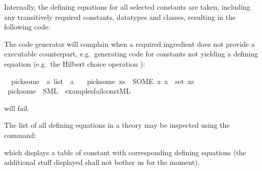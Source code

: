 \begin{isabellebody}
\begin{isamarkuptext}
  Internally, the defining equations for all selected
  constants are taken, including any transitively required
  constants, datatypes and classes, resulting in the following
  code:


  The code generator will complain when a required
  ingredient does not provide a executable counterpart,
  e.g.~generating code
  for constants not yielding
  a defining equation (e.g.~the Hilbert choice
  operation ):%
\end{isamarkuptext}%
\isamarkuptrue%
%
\isadelimML
%
\endisadelimML
%
\isatagML
%
\endisatagML
{\isafoldML}%
%
\isadelimML
%
\endisadelimML
{}\isamarkupfalse%
\isanewline
\ \ pick{\isacharunderscore}some\ {\isacharcolon}{\isacharcolon}\ {\isachardoublequoteopen}{\isacharprime}a\ list\ {\isasymRightarrow}\ {\isacharprime}a{\isachardoublequoteclose}\ \isanewline
\ \ {\isachardoublequoteopen}pick{\isacharunderscore}some\ xs\ {\isacharequal}\ {\isacharparenleft}SOME\ x{\isachardot}\ x\ {\isasymin}\ set\ xs{\isacharparenright}{\isachardoublequoteclose}%
\isadelimML
%
\endisadelimML
%
\isatagML
%
\endisatagML
{\isafoldML}%
%
\isadelimML
%
\endisadelimML
{}\isamarkupfalse%
\ pick{\isacharunderscore}some\ \ SML\ \ {\isachardoublequoteopen}examples{\isacharslash}fail{\isacharunderscore}const{\isachardot}ML{\isachardoublequoteclose}%
\begin{isamarkuptext}%
\noindent will fail.%
\end{isamarkuptext}%
\isamarkuptrue%
%
\isamarkuptrue%
%
\begin{isamarkuptext}%
The list of all defining equations in a theory may be inspected
  using the \isa{{\isasymPRINTCODESETUP}} command:%
\end{isamarkuptext}%
\isamarkuptrue%
\isamarkupfalse%
%
\begin{isamarkuptext}%
\noindent which displays a table of constant with corresponding
  defining equations (the additional stuff displayed
  shall not bother us for the moment).


\end{isamarkuptext}
\end{isabellebody}
